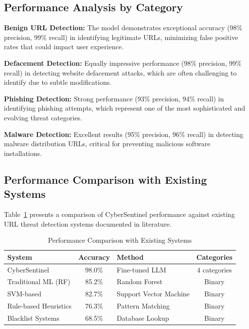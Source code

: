 \subsection{Performance Analysis by Category}

\textbf{Benign URL Detection:} The model demonstrates exceptional accuracy (98\% precision, 99\% recall) in identifying legitimate URLs, minimizing false positive rates that could impact user experience.

\textbf{Defacement Detection:} Equally impressive performance (98\% precision, 99\% recall) in detecting website defacement attacks, which are often challenging to identify due to subtle modifications.

\textbf{Phishing Detection:} Strong performance (93\% precision, 94\% recall) in identifying phishing attempts, which represent one of the most sophisticated and evolving threat categories.

\textbf{Malware Detection:} Excellent results (95\% precision, 96\% recall) in detecting malware distribution URLs, critical for preventing malicious software installations.

\subsection{Performance Comparison with Existing Systems}

Table~\ref{tab:system-comparison} presents a comparison of CyberSentinel performance against existing URL threat detection systems documented in literature.

\begin{table}[htbp]
	\centering
	\caption{Performance Comparison with Existing Systems}
	\label{tab:system-comparison}
	\begin{tabular}{lclc}
		\toprule
		\textbf{System} & \textbf{Accuracy} & \textbf{Method} & \textbf{Categories} \\
		\midrule
		CyberSentinel & 98.0\% & Fine-tuned LLM & 4 categories \\
		Traditional ML (RF) & 85.2\% & Random Forest & Binary \\
		SVM-based & 82.7\% & Support Vector Machine & Binary \\
		Rule-based Heuristics & 76.3\% & Pattern Matching & Binary \\
		Blacklist Systems & 68.5\% & Database Lookup & Binary \\
		\bottomrule
	\end{tabular}
\end{table}

